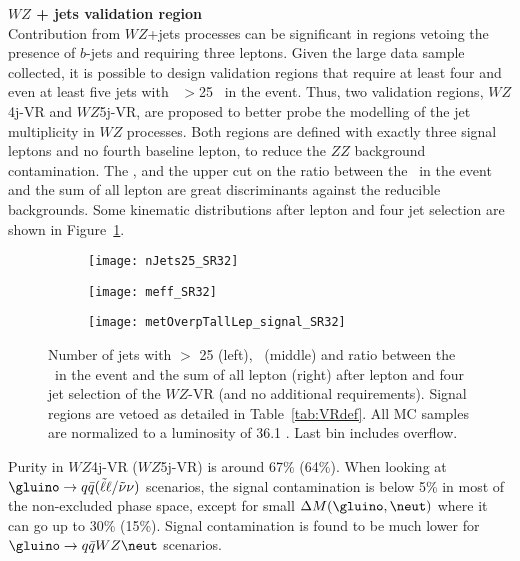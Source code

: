 \par{\bf $WZ$ + jets validation region\\}
Contribution from $WZ$+jets processes can be significant in regions vetoing the presence of $b$-jets and requiring three leptons. 
Given the large data sample collected, it is possible to design validation 
regions that require at least four and even at least five jets with \pt~$>$25 \GeV~in the event. Thus, two validation regions, $WZ$4j-VR and $WZ$5j-VR, are proposed to better probe the modelling of the jet multiplicity in $WZ$ processes. Both regions are defined with exactly three signal leptons and no fourth baseline lepton, to reduce the $ZZ$ background contamination. The \meff, and the upper cut on the ratio between the \met\ in the event and the sum of all lepton \pt are great discriminants against the reducible backgrounds. Some kinematic distributions after lepton and four jet selection are shown in Figure~\ref{fig:WZ_VR_afterLepJetSel}.

\begin{figure}[t!]
\centering
\begin{subfigure}[t]{0.32\textwidth}
\texttt{[image: nJets25\_SR32]}
\end{subfigure}
\begin{subfigure}[t]{0.32\textwidth}
\texttt{[image: meff\_SR32]}
\end{subfigure}
\begin{subfigure}[t]{0.32\textwidth}
\texttt{[image: metOverpTallLep\_signal\_SR32]}
\end{subfigure}
\caption{Number of jets with \pt $>$ 25 \GeV (left), \meff\ (middle) and ratio between the \met\ in the event and the sum of all lepton \pt (right) after lepton and four jet selection of the $WZ$-VR (and no additional requirements). Signal regions are vetoed as detailed in Table~\ref{tab:VRdef}. All MC samples are normalized to a luminosity of 36.1 \ifb. Last bin includes overflow.
}
\label{fig:WZ_VR_afterLepJetSel}
\end{figure} 

Purity in $WZ$4j-VR ($WZ$5j-VR) is around 67$\%$ (64\%). When looking at $\gluino \rightarrow q \bar q (\tilde \ell \ell / \tilde \nu \nu)$ scenarios, the signal contamination is below 5\% in most of the non-excluded phase space, except for small $\Delta M(\gluino,\neut)$ where it can go up to 30\% (15\%). Signal contamination is found to be much lower for $\gluino \rightarrow q \bar q WZ \neut$ scenarios.



